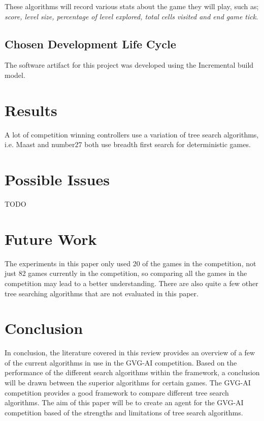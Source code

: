 \documentclass[journal]{IEEEtran}
\begin{document}
	These algorithms will record various stats about the game they will play, such as; \textit{score, level size, percentage of level explored, total cells visited and end game tick}.
	
	
		
	\subsection{Chosen Development Life Cycle}
		The software artifact for this project was developed using the Incremental build model.



\section{Results}

A lot of competition winning controllers use a variation of tree search algorithms, i.e. Maast and number27  \cite{perez2018general, schuster2015mcts} both use breadth first search for deterministic games.


\section{Possible Issues}
TODO



\section{Future Work}

The experiments in this paper only used 20 of the games in the competition, not just 82 games currently in the competition, so comparing all the games in the competition may lead to a better understanding. %
There are also quite a few other tree searching algorithms that are not evaluated in this paper.




\section{Conclusion}
	In conclusion, the literature covered in this review provides an overview of a few of the current algorithms in use in the GVG-AI competition.
	Based on the performance of the different search algorithms within the framework, a conclusion will be drawn between the superior algorithms for certain games.
	The GVG-AI competition provides a good framework to compare different tree search algorithms. 
	The aim of this paper will be to create an agent for the GVG-AI competition based of the strengths and limitations of tree search algorithms.
	 
\end{document}
